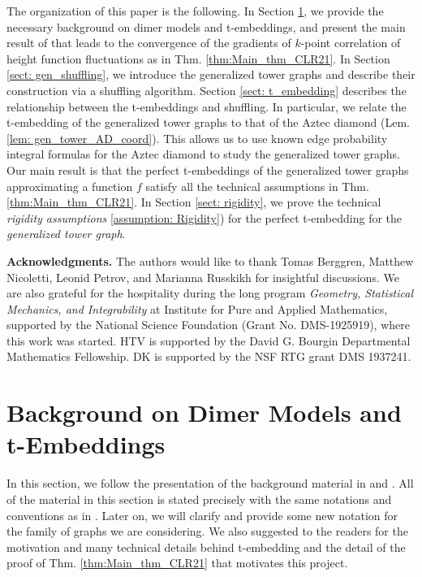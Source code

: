 \documentclass[12pt]{amsart}
\numberwithin{equation}{section}
\theoremstyle{definition}
\begin{document}
The organization of this paper is the following. In Section \ref{sect: background}, we provide the necessary background on dimer models and t-embeddings, and present the main result of \cite{chelkak2021bipartitedimermodelperfect,MR4588721} that leads to the convergence of the gradients of $k$-point correlation of height function fluctuations as in Thm. \ref{thm:Main_thm_CLR21}. In Section \ref{sect: gen_shuffling}, we introduce the generalized tower graphs and describe their construction via a shuffling algorithm. Section \ref{sect: t_embedding} describes the relationship between the t-embeddings and shuffling. In particular, we relate the t-embedding of the generalized tower graphs to that of the Aztec diamond (Lem. \ref{lem: gen_tower_AD_coord}).  This allows us to use known edge probability integral formulas for the Aztec diamond to study the generalized tower graphs. Our main result is that the perfect t-embeddings of the generalized tower graphs approximating a function $f$ satisfy all the technical assumptions in Thm. \ref{thm:Main_thm_CLR21}. In Section \ref{sect: rigidity}, we prove the technical \emph{rigidity assumptions} \ref{assumption: Rigidity}) for the perfect t-embedding for the \emph{generalized tower graph}. 

\textbf{Acknowledgments.} The authors would like to thank Tomas Berggren, Matthew Nicoletti, Leonid Petrov, and Marianna Russkikh for insightful discussions. We are also grateful for the hospitality during the long program \emph{Geometry, Statistical Mechanics, and Integrability} at Institute for Pure and Applied Mathematics, supported by the
National Science Foundation (Grant No. DMS-1925919), where this work was started.  HTV is supported by the David G. Bourgin Departmental Mathematics Fellowship. DK is supported by the NSF RTG grant DMS 1937241.

\section{Background on Dimer Models and t-Embeddings}
\label{sect: background}
In this section, we follow the presentation of the background material in \cite{tower_AD_perfect} and \cite{chelkak2021fluctuations}. All of the material in this section is stated precisely with the same notations and conventions as in \cite{tower_AD_perfect}. Later on, we will clarify and provide some new notation for the family of graphs we are considering. We also suggested to the readers \cite{chelkak2021bipartitedimermodelperfect,MR4588721} for the motivation and many technical details behind t-embedding and the detail of the proof of Thm. \ref{thm:Main_thm_CLR21} that motivates this project. 
\end{document}
